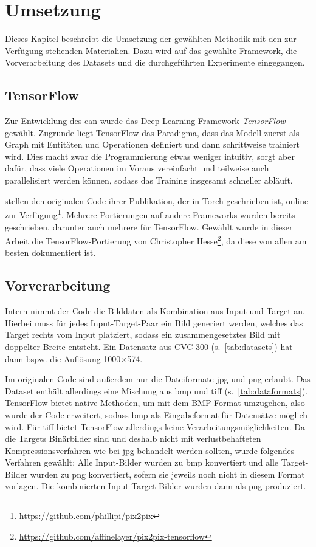 \chapter{Umsetzung}

Dieses Kapitel beschreibt die Umsetzung der gewählten Methodik mit den zur Verfügung stehenden Materialien.
Dazu wird auf das gewählte Framework, die Vorverarbeitung des Datasets und die durchgeführten Experimente eingegangen.



\section{TensorFlow}

Zur Entwicklung des \gls{can} wurde das Deep-Learning-Framework \emph{TensorFlow}~\cite{Abadi.2016} gewählt.
Zugrunde liegt TensorFlow das Paradigma, dass das Modell zuerst als Graph mit Entitäten und Operationen definiert und dann schrittweise trainiert wird.
Dies macht zwar die Programmierung etwas weniger intuitiv, sorgt aber dafür, dass viele Operationen im Voraus vereinfacht und teilweise auch parallelisiert werden können, sodass das Training insgesamt schneller abläuft.

\citeauthor{Isola.2017} stellen den originalen Code ihrer Publikation, der in Torch geschrieben ist, online zur Verfügung\footnote{\url{https://github.com/phillipi/pix2pix}}.
Mehrere Portierungen auf andere Frameworks wurden bereits geschrieben, darunter auch mehrere für TensorFlow.
Gewählt wurde in dieser Arbeit die TensorFlow-Portierung von Christopher Hesse\footnote{\url{https://github.com/affinelayer/pix2pix-tensorflow}}, da diese von allen am besten dokumentiert ist.



\section{Vorverarbeitung}

Intern nimmt der Code die Bilddaten als Kombination aus Input und Target an.
Hierbei muss für jedes Input-Target-Paar ein Bild generiert werden, welches das Target rechts vom Input platziert, sodass ein zusammengesetztes Bild mit doppelter Breite entsteht.
Ein Datensatz aus CVC-300 (s.~\autoref{tab:datasets}) hat dann bspw. die Auflösung 1000$\times$574.

Im originalen Code sind außerdem nur die Dateiformate \gls{jpg} und \gls{png} erlaubt.
Das Dataset enthält allerdings eine Mischung aus \gls{bmp} und \gls{tiff} (s.~\autoref{tab:dataformats}).
TensorFlow bietet native Methoden, um mit dem BMP-Format umzugehen, also wurde der Code erweitert, sodass \gls{bmp} als Eingabeformat für Datensätze möglich wird.
Für \gls{tiff} bietet TensorFlow allerdings keine Verarbeitungsmöglichkeiten.
Da die Targets Binärbilder sind und deshalb nicht mit verlustbehafteten Kompressionsverfahren wie bei \gls{jpg} behandelt werden sollten, wurde folgendes Verfahren gewählt:
Alle Input-Bilder wurden zu \gls{bmp} konvertiert und alle Target-Bilder wurden zu \gls{png} konvertiert, sofern sie jeweils noch nicht in diesem Format vorlagen.
Die kombinierten Input-Target-Bilder wurden dann als \gls{png} produziert.

